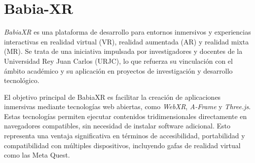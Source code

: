 \documentclass[a4paper, 12pt]{book}
\begin{document}



\section{Babia-XR}
\label{sec:babiaxr}

\textit{BabiaXR} es una plataforma de desarrollo para entornos inmersivos y experiencias interactivas en realidad virtual (VR), realidad aumentada (AR) y realidad mixta (MR). Se trata de una iniciativa impulsada por investigadores y docentes de la Universidad Rey Juan Carlos (URJC), lo que refuerza su vinculación con el ámbito académico y su aplicación en proyectos de investigación y desarrollo tecnológico.

El objetivo principal de BabiaXR es facilitar la creación de aplicaciones inmersivas mediante tecnologías web abiertas, como \textit{WebXR}, \textit{A-Frame} y \textit{Three.js}. Estas tecnologías permiten ejecutar contenidos tridimensionales directamente en navegadores compatibles, sin necesidad de instalar software adicional. Esto representa una ventaja significativa en términos de accesibilidad, portabilidad y compatibilidad con múltiples dispositivos, incluyendo gafas de realidad virtual como las Meta Quest.
\end{document}
